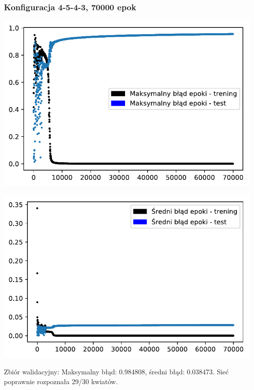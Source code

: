 \documentclass{classrep}
\begin{document}
\subsubsection{Konfiguracja 4-5-4-3, 70000 epok}
\begin{center}
  \includegraphics{output_0_6.pdf}
\end{center}
\begin{center}
  \includegraphics{output_0_7.pdf}
\end{center}

Zbiór walidacyjny: Maksymalny błąd: 0.984808, średni błąd: 0.038473.\newline
Sieć poprawnie rozpoznała 29/30 kwiatów.
\end{document}
